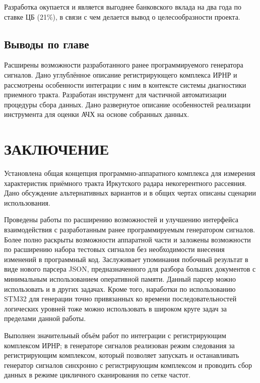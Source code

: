\documentclass{report}
\begin{document}
Разработка окупается и является выгоднее банковского вклада на два года по ставке ЦБ (21\%), в связи с чем делается вывод о целесообразности проекта.

\section*{Выводы по главе}
Расширены возможности разработанного ранее программируемого генератора сигналов. Дано углублённое описание регистрирующего комплекса ИРНР и рассмотрены особенности интеграции с ним в контексте системы диагностики приемного тракта. Разработан инструмент для частичной автоматизации процедуры сбора данных. Дано развернутое описание особенностей реализации инструмента для оценки АЧХ на основе собранных данных.

\chapter*{ЗАКЛЮЧЕНИЕ}

Установлена общая концепция программно-аппаратного комплекса для измерения характеристик приёмного тракта Иркутского радара некогерентного рассеяния. Дано обсуждение альтернативных вариантов и в общих чертах описаны сценарии использования.

Проведены работы по расширению возможностей и улучшению интерфейса взаимодействия с разработанным ранее программируемым генератором сигналов. Более полно раскрыты возможности аппаратной части и заложены возможности по расширению набора тестовых сигналов без необходимости внесения изменений в программный код. Заслуживает упоминания побочный результат в виде нового парсера JSON, предназначенного для разбора больших документов с минимальным использованием оперативной памяти. Данный парсер можно использовать и в других задачах. Кроме того, наработки по использованию STM32 для генерации точно привязанных ко времени последовательностей логических уровней тоже можно использовать в широком круге задач за пределами данной работы.

Выполнен значительный объём работ по интеграции с регистрирующим комплексом ИРНР; в генераторе сигналов реализован режим следования за регистрирующим комплексом, который позволяет запускать и останавливать генератор сигналов синхронно с регистрирующим комплексом и проводить сбор данных в режиме цикличного сканирования по сетке частот.
\end{document}
